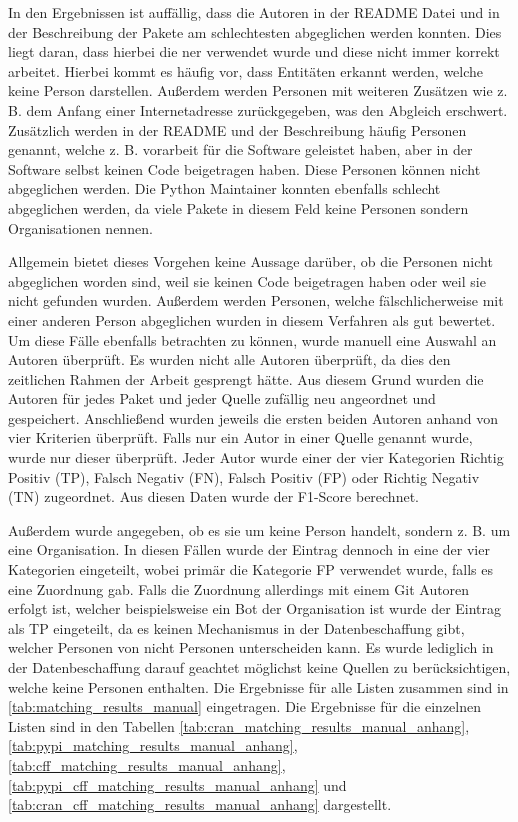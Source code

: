 In den Ergebnissen ist auffällig, dass die Autoren in der README Datei und in der Beschreibung der Pakete am schlechtesten abgeglichen werden konnten.
Dies liegt daran, dass hierbei die \gls{ner} verwendet wurde und diese nicht immer korrekt arbeitet.
Hierbei kommt es häufig vor, dass Entitäten erkannt werden, welche keine Person darstellen.
Außerdem werden Personen mit weiteren Zusätzen wie z. B. dem Anfang einer Internetadresse zurückgegeben, was den Abgleich erschwert.
Zusätzlich werden in der README und der Beschreibung häufig Personen genannt, welche z. B. vorarbeit für die Software geleistet haben, aber in der Software selbst keinen Code beigetragen haben.
Diese Personen können nicht abgeglichen werden.
Die Python Maintainer konnten ebenfalls schlecht abgeglichen werden, da viele Pakete in diesem Feld keine Personen sondern Organisationen nennen.

Allgemein bietet dieses Vorgehen keine Aussage darüber, ob die Personen nicht abgeglichen worden sind, weil sie keinen Code beigetragen haben oder weil sie nicht gefunden wurden.
Außerdem werden Personen, welche fälschlicherweise mit einer anderen Person abgeglichen wurden in diesem Verfahren als gut bewertet.
Um diese Fälle ebenfalls betrachten zu können, wurde manuell eine Auswahl an Autoren überprüft.
Es wurden nicht alle Autoren überprüft, da dies den zeitlichen Rahmen der Arbeit gesprengt hätte.
Aus diesem Grund wurden die Autoren für jedes Paket und jeder Quelle zufällig neu angeordnet und gespeichert.
Anschließend wurden jeweils die ersten beiden Autoren anhand von vier Kriterien überprüft.
Falls nur ein Autor in einer Quelle genannt wurde, wurde nur dieser überprüft.
Jeder Autor wurde einer der vier Kategorien \glqq Richtig Positiv (TP)\grqq{}, \glqq Falsch Negativ (FN)\grqq{}, \glqq Falsch Positiv (FP)\grqq{} oder \glqq Richtig Negativ (TN)\grqq{} zugeordnet.
Aus diesen Daten wurde der F1-Score berechnet.

Außerdem wurde angegeben, ob es sie um keine Person handelt, sondern z. B. um eine Organisation.
In diesen Fällen wurde der Eintrag dennoch in eine der vier Kategorien eingeteilt, wobei primär die Kategorie FP verwendet wurde, falls es eine Zuordnung gab.
Falls die Zuordnung allerdings mit einem Git Autoren erfolgt ist, welcher beispielsweise ein Bot der Organisation ist wurde der Eintrag als TP eingeteilt, da es keinen Mechanismus in der Datenbeschaffung gibt, welcher Personen von nicht Personen unterscheiden kann.
Es wurde lediglich in der Datenbeschaffung darauf geachtet möglichst keine Quellen zu berücksichtigen, welche keine Personen enthalten.
Die Ergebnisse für alle Listen zusammen sind in \autoref{tab:matching_results_manual} eingetragen.
Die Ergebnisse für die einzelnen Listen sind in den Tabellen \ref{tab:cran_matching_results_manual_anhang}, \ref{tab:pypi_matching_results_manual_anhang}, \ref{tab:cff_matching_results_manual_anhang}, \ref{tab:pypi_cff_matching_results_manual_anhang} und \ref{tab:cran_cff_matching_results_manual_anhang} dargestellt.


